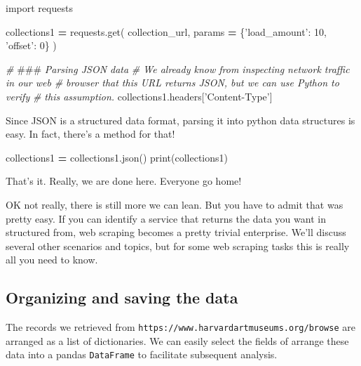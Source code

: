 \documentclass[]{book}
\newenvironment{Shaded}{\begin{snugshade}}{\end{snugshade}}
\newcommand{\DecValTok}[1]{\textcolor[rgb]{0.00,0.00,0.81}{#1}}
\newcommand{\StringTok}[1]{\textcolor[rgb]{0.31,0.60,0.02}{#1}}
\newcommand{\ImportTok}[1]{#1}
\newcommand{\CommentTok}[1]{\textcolor[rgb]{0.56,0.35,0.01}{\textit{#1}}}
\newcommand{\OperatorTok}[1]{\textcolor[rgb]{0.81,0.36,0.00}{\textbf{#1}}}
\newcommand{\BuiltInTok}[1]{#1}
\newcommand{\AlertTok}[1]{\textcolor[rgb]{0.94,0.16,0.16}{#1}}
\newcommand{\NormalTok}[1]{#1}
\begin{document}
\begin{Shaded}
\begin{Highlighting}[]
\ImportTok{import}\NormalTok{ requests}

\NormalTok{collections1 }\OperatorTok{=}\NormalTok{ requests.get(}
\NormalTok{    collection_url,}
\NormalTok{    params }\OperatorTok{=}\NormalTok{ \{}\StringTok{'load_amount'}\NormalTok{: }\DecValTok{10}\NormalTok{,}
                  \StringTok{'offset'}\NormalTok{: }\DecValTok{0}\NormalTok{\}}
\NormalTok{)}
\end{Highlighting}
\end{Shaded}

\begin{Shaded}
\begin{Highlighting}[]
\CommentTok{# }\AlertTok{###}\CommentTok{ Parsing JSON data}
\CommentTok{# We already know from inspecting network traffic in our web}
\CommentTok{# browser that this URL returns JSON, but we can use Python to verify}
\CommentTok{# this assumption.}
\NormalTok{collections1.headers[}\StringTok{'Content-Type'}\NormalTok{]}
\end{Highlighting}
\end{Shaded}

Since JSON is a structured data format, parsing it into python data
structures is easy. In fact, there's a method for that!

\begin{Shaded}
\begin{Highlighting}[]
\NormalTok{collections1 }\OperatorTok{=}\NormalTok{ collections1.json()}
\BuiltInTok{print}\NormalTok{(collections1)}
\end{Highlighting}
\end{Shaded}

That's it. Really, we are done here. Everyone go home!

OK not really, there is still more we can lean. But you have to admit
that was pretty easy. If you can identify a service that returns the
data you want in structured from, web scraping becomes a pretty trivial
enterprise. We'll discuss several other scenarios and topics, but for
some web scraping tasks this is really all you need to know.

\subsection{Organizing and saving the
data}\label{organizing-and-saving-the-data}

The records we retrieved from
\texttt{https://www.harvardartmuseums.org/browse} are arranged as a list
of dictionaries. We can easily select the fields of arrange these data
into a pandas \texttt{DataFrame} to facilitate subsequent analysis.
\end{document}
